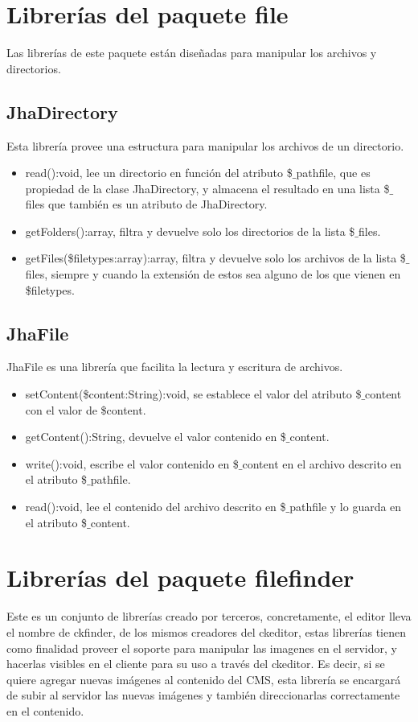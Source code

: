 \section{Librer\'ias del paquete \textsf{file}}
Las librer\'ias de este paquete est\'an dise\~nadas para manipular los archivos y directorios.

\subsection{JhaDirectory}
Esta librer\'ia provee una estructura para manipular los archivos de un directorio.
\begin{itemize}
\item \textsf{read():void}, lee un directorio en funci\'on del atributo \textsf{\$$\_$pathfile}, que es propiedad de la clase JhaDirectory, y almacena el resultado en una lista \textsf{\$$\_$files} que tambi\'en es un atributo de JhaDirectory.
\item \textsf{getFolders():array}, filtra y devuelve solo los directorios de la lista \textsf{\$$\_$files}.
\item \textsf{getFiles(\$filetypes:array):array}, filtra y devuelve solo los archivos de la lista \textsf{\$$\_$files}, siempre y cuando la extensi\'on de estos sea alguno de los que vienen en \textsf{\$filetypes}.
\end{itemize}

\subsection{JhaFile}
JhaFile es una librer\'ia que facilita la lectura y escritura de archivos.
\begin{itemize}
\item \textsf{setContent(\$content:String):void}, se establece el valor del atributo \textsf{\$$\_$content} con el valor de \textsf{\$content}.
\item \textsf{getContent():String}, devuelve el valor contenido en \textsf{\$$\_$content}.
\item \textsf{write():void}, escribe el valor contenido en \textsf{\$$\_$content} en el archivo descrito en el atributo \textsf{\$$\_$pathfile}.
\item \textsf{read():void}, lee el contenido del archivo descrito en \textsf{\$$\_$pathfile} y lo guarda en el atributo \textsf{\$$\_$content}.
\end{itemize}

\section{Librer\'ias del paquete \textsf{filefinder}}
Este es un conjunto de librer\'ias creado por terceros, concretamente, el editor lleva el nombre de ckfinder, de los mismos creadores del ckeditor, estas librer\'ias tienen como finalidad proveer el soporte para manipular las imagenes en el servidor, y hacerlas visibles en el cliente para su uso a trav\'es del ckeditor. Es decir, si se quiere agregar nuevas im\'agenes al contenido del CMS, esta librer\'ia se encargar\'a de subir al servidor las nuevas im\'agenes y tambi\'en direccionarlas correctamente en el contenido.

